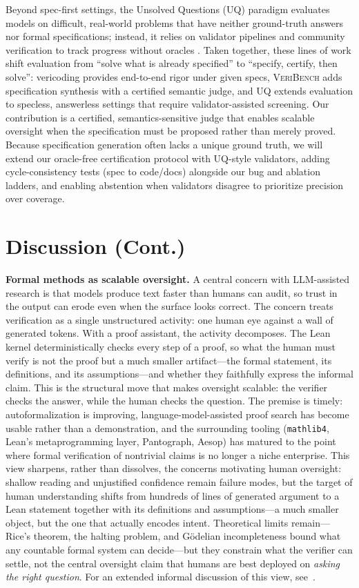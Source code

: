 Beyond spec-first settings, the Unsolved Questions (UQ) paradigm evaluates models on difficult, real-world problems that have neither ground-truth answers nor formal specifications; instead, it relies on validator pipelines and community verification to track progress without oracles \cite{nie2025uqassessinglanguagemodels,uq2025}. 
Taken together, these lines of work shift evaluation from “solve what is already specified” to “specify, certify, then solve”: 
vericoding provides end-to-end rigor under given specs, \textsc{VeriBench} adds specification synthesis with a certified semantic judge, and UQ extends evaluation to specless, answerless settings that require validator-assisted screening. 
Our contribution is a certified, semantics-sensitive judge that enables scalable oversight when the specification must be proposed rather than merely proved. 
Because specification generation often lacks a unique ground truth, we will extend our oracle-free certification protocol with UQ-style validators, adding cycle-consistency tests (spec to code/docs) alongside our bug and ablation ladders, and enabling abstention when validators disagree to prioritize precision over coverage.

\section{Discussion (Cont.)}
\textbf{Formal methods as scalable oversight.}
A central concern with LLM-assisted research is that models produce text faster than humans can audit, so trust in the output can erode even when the surface looks correct.
The concern treats verification as a single unstructured activity: one human eye against a wall of generated tokens.
With a proof assistant, the activity decomposes.
The Lean kernel deterministically checks every step of a proof, so what the human must verify is not the proof but a much smaller artifact---the formal statement, its definitions, and its assumptions---and whether they faithfully express the informal claim.
This is the structural move that makes oversight scalable: the verifier checks the answer, while the human checks the question.
The premise is timely: autoformalization is improving, language-model-assisted proof search has become usable rather than a demonstration, and the surrounding tooling (\texttt{mathlib4}, Lean's metaprogramming layer, Pantograph, Aesop) has matured to the point where formal verification of nontrivial claims is no longer a niche enterprise.
This view sharpens, rather than dissolves, the concerns motivating human oversight: shallow reading and unjustified confidence remain failure modes, but the target of human understanding shifts from hundreds of lines of generated argument to a Lean statement together with its definitions and assumptions---a much smaller object, but the one that actually encodes intent.
Theoretical limits remain---Rice's theorem, the halting problem, and G\"odelian incompleteness bound what any countable formal system can decide---but they constrain what the verifier can settle, not the central oversight claim that humans are best deployed on \emph{asking the right question}.
For an extended informal discussion of this view, see~\citep{miranda2026formaloversight}.

